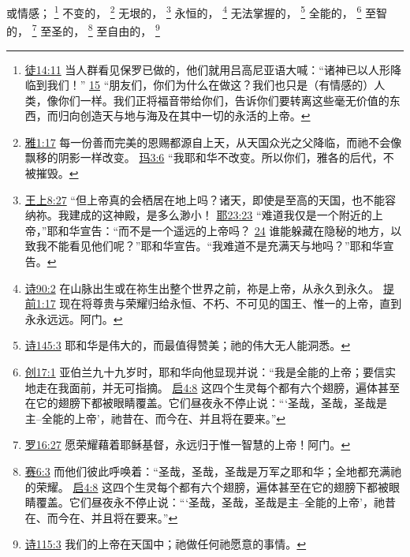 \documentclass[12pt, a4paper, oneside]{ctexart}
\begin{document}
	或情感；
	\footnote {
		\href{https://biblehub.com/acts/14-11.htm}{徒14:11} 当人群看见保罗已做的，他们就用吕高尼亚语大喊：“诸神已以人形降临到我们！”
		\href{https://biblehub.com/acts/14-15.htm}{15} “朋友们，你们为什么在做这？我们也只是（有情感的）人类，像你们一样。我们正将福音带给你们，告诉你们要转离这些毫无价值的东西，而归向创造天与地与海及在其中一切的永活的上帝。
	}
	不变的，
	\footnote {
		\href{https://biblehub.com/james/1-17.htm}{雅1:17} 每一份善而完美的恩赐都源自上天，从天国众光之父降临，而祂不会像飘移的阴影一样改变。
		\href{https://biblehub.com/malachi/3-6.htm}{玛3:6} “我耶和华不改变。所以你们，雅各的后代，不被摧毁。
	}
	无垠的，
	\footnote {
		\href{https://biblehub.com/1_kings/8-27.htm}{王上8:27} “但上帝真的会栖居在地上吗？诸天，即使是至高的天国，也不能容纳祢。我建成的这神殿，是多么渺小！
		\href{https://biblehub.com/jeremiah/23-23.htm}{耶23:23} “难道我仅是一个附近的上帝，”耶和华宣告：“而不是一个遥远的上帝吗？
		\href{https://biblehub.com/jeremiah/23-24.htm}{24} 谁能躲藏在隐秘的地方，以致我不能看见他们呢？”耶和华宣告。“我难道不是充满天与地吗？”耶和华宣告。
	}
	永恒的，
	\footnote {
		\href{https://biblehub.com/psalms/90-2.htm}{诗90:2} 在山脉出生或在祢生出整个世界之前，祢是上帝，从永久到永久。
		\href{https://biblehub.com/1_timothy/1-17.htm}{提前1:17} 现在将尊贵与荣耀归给永恒、不朽、不可见的国王、惟一的上帝，直到永永远远。阿门。
	}
	无法掌握的，
	\footnote {
		\href{https://biblehub.com/psalms/145-3.htm}{诗145:3} 耶和华是伟大的，而最值得赞美；祂的伟大无人能洞悉。
	}
	全能的，
	\footnote {
		\href{https://biblehub.com/genesis/17-1.htm}{创17:1} 亚伯兰九十九岁时，耶和华向他显现并说：“我是全能的上帝；要信实地走在我面前，并无可指摘。
		\href{https://biblehub.com/revelation/4-8.htm}{启4:8} 这四个生灵每个都有六个翅膀，遍体甚至在它的翅膀下都被眼睛覆盖。它们昼夜永不停止说：“‘圣哉，圣哉，圣哉是主--全能的上帝’，祂昔在、而今在、并且将在要来。”
	}
	至智的，
	\footnote {
		\href{https://biblehub.com/romans/16-27.htm}{罗16:27} 愿荣耀藉着耶稣基督，永远归于惟一智慧的上帝！阿门。
	}
	至圣的，
	\footnote {
		\href{https://biblehub.com/isaiah/6-3.htm}{赛6:3} 而他们彼此呼唤着：“圣哉，圣哉，圣哉是万军之耶和华；全地都充满祂的荣耀。
		\href{https://biblehub.com/revelation/4-8.htm}{启4:8} 这四个生灵每个都有六个翅膀，遍体甚至在它的翅膀下都被眼睛覆盖。它们昼夜永不停止说：“‘圣哉，圣哉，圣哉是主--全能的上帝’，祂昔在、而今在、并且将在要来。”
	}
	至自由的，
	\footnote {
		\href{https://biblehub.com/psalms/115-3.htm}{诗115:3} 我们的上帝在天国中；祂做任何祂愿意的事情。
	}
\end{document}

